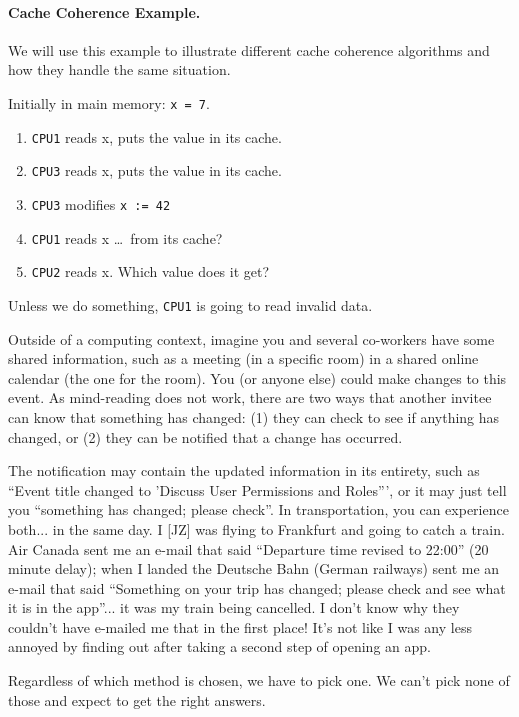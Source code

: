 \documentclass[a4paper]{report}
\begin{document}
\paragraph{Cache Coherence Example.} We will use this example to illustrate
different cache coherence algorithms and how they handle the same situation.

Initially in main memory: {\tt x = 7}.

  \begin{enumerate}
    \item {\tt CPU1} reads x, puts the value in its cache.
    \item {\tt CPU3} reads x, puts the value in its cache.
    \item {\tt CPU3} modifies {\tt x := 42}
    \item {\tt CPU1} reads x \ldots ~from its cache?
    \item {\tt CPU2} reads x. Which value does it get?
  \end{enumerate}

Unless we do something, {\tt CPU1} is going to read invalid data.
  
Outside of a computing context, imagine you and several co-workers have some shared information, such as a meeting (in a specific room) in a shared online calendar (the one for the room). You (or anyone else) could make changes to this event. As mind-reading does not work, there are two ways that another invitee can know that something has changed: (1) they can check to see if anything has changed, or (2) they can be notified that a change has occurred. 

The notification may contain the updated information in its entirety, such as ``Event title changed to 'Discuss User Permissions and Roles''', or it may just tell you ``something has changed; please check''. In transportation, you can experience both... in the same day. I [JZ] was flying to Frankfurt and going to catch a train. Air Canada sent me an e-mail that said ``Departure time revised to 22:00'' (20 minute delay); when I landed the Deutsche Bahn (German railways) sent me an e-mail that said ``Something on your trip has changed; please check and see what it is in the app''... it was my train being cancelled. I don't know why they couldn't have e-mailed me that in the first place! It's not like I was any less annoyed by finding out after taking a second step of opening an app.

Regardless of which method is chosen, we have to pick one. We can't pick none of those and expect to get the right answers.
\end{document}
